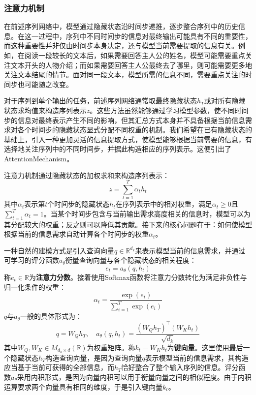 \subsubsection{注意力机制}
在前述序列网络中，模型通过隐藏状态沿时间步递推，逐步整合序列中的历史信息。在这一过程中，序列中不同时间步的信息对最终输出可能具有不同的重要性，而这种重要性并非仅由时间步本身决定，还与模型当前需要提取的信息有关。例如，在阅读一段较长的文本后，如果需要回答主人公的姓名，模型可能需要重点关注文本开头的人物介绍；而如果需要回答主人公最终去了哪里，则可能需要更多地关注文本结尾的情节。面对同一段文本，模型所需的信息不同，需要重点关注的时间步也可能随之改变。\par
对于序列到单个输出的任务，前述序列网络通常取最终隐藏状态$h_T$或对所有隐藏状态求均值来构造序列表示$z$。这些方法虽然能够通过学习模型参数，使不同时间步的信息对最终表示产生不同的影响，但其汇总方式本身并不具备根据当前信息需求对各个时间步的隐藏状态显式分配不同权重的机制。我们希望在已有隐藏状态的基础上，引入一种更加灵活的信息提取方式，使模型能够根据当前需要的信息，有选择地关注序列中的不同时间步，并据此构造相应的序列表示。这便引出了\gls{AttentionMechanism}。\par
注意力机制通过隐藏状态的加权求和来构造序列表示：
\begin{equation*}
	z=\sum_{t=1}^{T}\alpha_th_t
\end{equation*}
其中$\alpha_t$表示第$t$个时间步的隐藏状态$h_t$在序列表示中的相对权重，满足$\alpha_t\geqslant0$且$\sum\limits_{t=1}^{T}\alpha_t=1$。当某个时间步包含与当前输出需求高度相关的信息时，模型可以为其分配较大的权重；反之则可以降低其贡献。接下来的核心问题在于：如何使模型根据当前的信息需求自动计算各个时间步的权重$\alpha_t$。\par
一种自然的建模方式是引入查询向量$q\in\mathbb{R}^{d_k}$来表示模型当前的信息需求，并通过可学习的评分函数$a_\theta$衡量查询向量与各个隐藏状态的相关程度：
\begin{equation*}
	e_t=a_\theta(q,h_t)
\end{equation*}
称$e_t\in\mathbb{R}$为\textbf{注意力分数}。接着使用Softmax函数将注意力分数转化为满足非负性与归一化条件的权重：
\begin{equation*}
	\alpha_t=\frac{\exp(e_t)}{\sum\limits_{i=1}^{T}\exp(e_i)}
\end{equation*}
$q$与$a_{\theta}$一般的具体形式为：
\begin{equation*}
	q=W_Qh_T,\quad a_\theta(q,h_t)=\frac{(W_Qh_T)^\top(W_Kh_t)}{\sqrt{d_k}}
\end{equation*}
其中$W_Q,W_K\in M_{d_k\times d}(\mathbb{R})$为权重矩阵。称$k_t=W_Kh_t$为\textbf{键向量}。这里使用最后一个隐藏状态$h_T$构造查询向量，是因为查询向量$q$表示模型当前的信息需求，其构造应当基于当前可获得的全部信息，而$h_T$恰好整合了整个输入序列的信息。评分函数$a_\theta$采用内积形式，是因为向量内积可以用于衡量向量之间的相似程度。由于内积运算要求两个向量具有相同的维度，于是引入键向量$k_t$。
